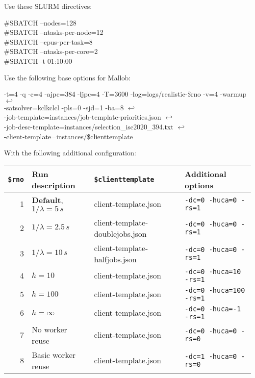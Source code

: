 \documentclass[runningheads]{article}
\newcommand{\CR}{{\tiny$\hookleftarrow$}}
\numberwithin{dummy}{subsection}
\begin{document}
 Use these SLURM directives:
\begin{ttfenv}
\#SBATCH --nodes=128\\
\#SBATCH --ntasks-per-node=12\\
\#SBATCH --cpus-per-task=8\\
\#SBATCH --ntasks-per-core=2\\
\#SBATCH -t 01:10:00
\end{ttfenv}

Use the following base options for Mallob:

\begin{ttfenv}
-t=4 -q -c=4 -ajpc=384 -ljpc=4 -T=3600 -log=logs/realistic-\$rno -v=4 -warmup \CR\\
-satsolver=kclkclcl -pls=0 -sjd=1 -ba=8  \CR\\
 -job-template=instances/job-template-priorities.json  \CR\\
 -job-desc-template=instances/selection\_isc2020\_394.txt  \CR\\
 -client-template=instances/\$clienttemplate
\end{ttfenv}

With the following additional configuration:\\

{
\begin{tabular}{|r|l|l|l|}
\hline
\texttt{\$rno} & Run description & \texttt{\$clienttemplate} & Additional options \\
\hline
1 & \textbf{Default}, $1/\lambda=5\,s$ & client-template.json & \texttt{-dc=0 -huca=0 -rs=1} \\
2 & $1/\lambda=2.5\,s$ & client-template-doublejobs.json & \texttt{-dc=0 -huca=0 -rs=1} \\
3 & $1/\lambda=10\,s$ & client-template-halfjobs.json & \texttt{-dc=0 -huca=0 -rs=1} \\
\hline
4 & $h=10$ & client-template.json & \texttt{-dc=0 -huca=10 -rs=1} \\
5 & $h=100$ & client-template.json & \texttt{-dc=0 -huca=100 -rs=1} \\
6 & $h=\infty$ & client-template.json & \texttt{-dc=0 -huca=-1 -rs=1} \\
\hline
7 & No worker reuse & client-template.json & \texttt{-dc=0 -huca=0 -rs=0} \\
8 & Basic worker reuse & client-template.json & \texttt{-dc=1 -huca=0 -rs=0} \\
\hline
\end{tabular}
}
\vspace{0.4cm}
\end{document}
